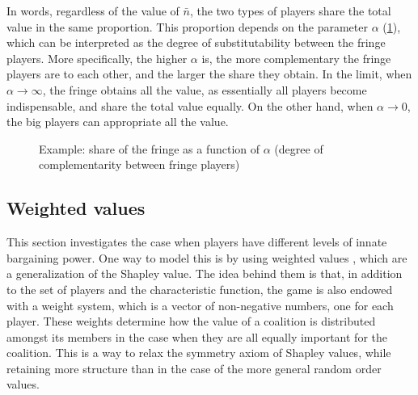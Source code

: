 \documentclass[a4paper]{article}
\begin{document}
In words, regardless of the value of $\bar{n}$, the two types of players share the total value in the same proportion.
This proportion depends on the parameter $\alpha$ (\cref{fig:power_function_example}), which can be interpreted as the degree of substitutability between the fringe players.
More specifically, the higher $\alpha$ is, the more complementary the fringe players are to each other, and the larger the share they obtain.
In the limit, when $\alpha \to \infty$, the fringe obtains all the value, as essentially all players become indispensable, and share the total value equally.
On the other hand, when $\alpha \to 0$, the big players can appropriate all the value.

\begin{figure}
    \centering
    \caption{Example: share of the fringe as a function of $\alpha$ (degree of complementarity between fringe players)}
    \label{fig:power_function_example}
\end{figure}


\subsection{Weighted values}

This section investigates the case when players have different levels of innate bargaining power.
One way to model this is by using weighted values \parencite{shapley1953additive}, which are a generalization of the Shapley value.
The idea behind them is that, in addition to the set of players and the characteristic function, the game is also endowed with a weight system, which is a vector of non-negative numbers, one for each player.
These weights determine how the value of a coalition is distributed amongst its members in the case when they are all equally important for the coalition.
This is a way to relax the symmetry axiom of Shapley values, while retaining more structure than in the case of the more general random order values.
\end{document}
